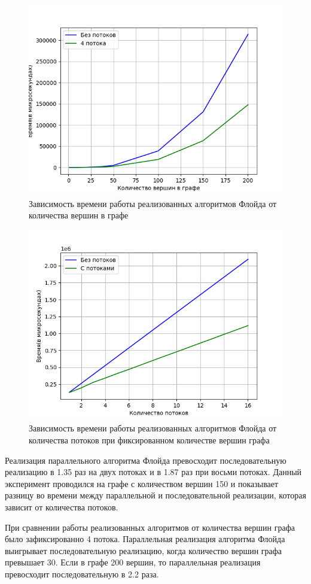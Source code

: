\begin{figure}[H]
	\centering
	\includegraphics[width=140mm]{images/result}
	\caption{Зависимость времени работы реализованных алгоритмов Флойда от количества вершин в графе}
	\label{img:result}
\end{figure}
\begin{figure}[H]
	\centering
	\includegraphics[width=140mm]{images/resultParallel}
	\caption{Зависимость времени работы реализованных алгоритмов Флойда от количества потоков при фиксированном количестве вершин графа}
	\label{img:resultParallel}
\end{figure}

\clearpage
Реализация параллельного алгоритма Флойда превосходит последовательную реализацию в 1.35 раз на двух потоках и в 1.87 раз при восьми потоках. Данный эксперимент проводился на графе с количеством вершин 150 и показывает разницу во времени между параллельной и последовательной реализации, которая зависит от количества потоков.

При сравнении работы реализованных алгоритмов от количества вершин графа было зафиксированно 4 потока. Параллельная реализация алгоритма Флойда выигрывает последовательную реализацию, когда количество вершин графа превышает 30. Если в графе 200 вершин, то параллельная реализация превосходит последовательную в 2.2 раза.
